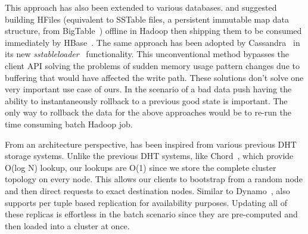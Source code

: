This approach has also been extended to various databases. \cite{konstantinou} and \cite{barbuzzi} suggested building HFiles (equivalent to SSTable files, a persistent immutable map data structure, from BigTable~\cite{bigtable}) offline in Hadoop then shipping them to be consumed immediately by HBase~\cite{hbase}. The same approach has been adopted by Cassandra~\cite{cassandra} in its new \emph{sstableloader}~\cite{cassandra_bulk} functionality. This unconventional method bypasses the client API solving the problems of sudden memory usage pattern changes due to buffering that would have affected the write path. These solutions don't solve one very important use case of ours. In the scenario of a bad data push having the ability to instantaneously rollback to a previous good state is important. The only way to rollback the data for the above approaches would be to re-run the time consuming batch Hadoop job.

From an architecture perspective, \projectname{} has been inspired from various previous DHT storage systems. Unlike the previous DHT systems, like Chord~\cite{chord}, which provide O(log N) lookup, our lookups are O(1) since we store the complete cluster topology on every node. This allows our clients to bootstrap from a random node and then direct requests to exact destination nodes. Similar to Dynamo~\cite{dynamo}, \projectname{} also supports per tuple based replication for availability purposes. Updating all of these replicas is effortless in the batch scenario since they are pre-computed and then loaded into a \projectname{} cluster at once. 

